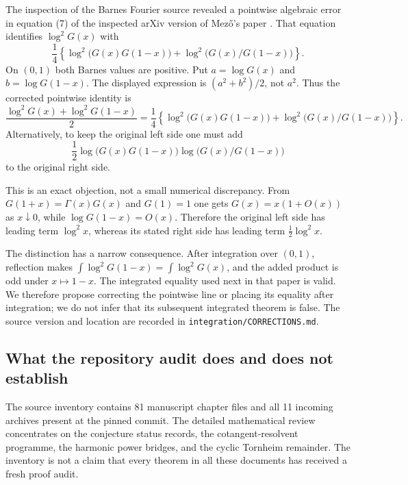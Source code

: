 \documentclass[11pt]{article}
\numberwithin{equation}{section}
\theoremstyle{plain}
\theoremstyle{definition}
\theoremstyle{remark}
\newcommand{\src}[1]{\nolinkurl{#1}}
\begin{document}
The inspection of the Barnes Fourier source revealed a pointwise
algebraic error in equation (7) of the inspected arXiv version of
Mez\H{o}'s paper \cite{bhr:Mezo}. That equation identifies
$\log^2G(x)$ with
\[
 \frac14\left\{
   \log^2\bigl(G(x)G(1-x)\bigr)
   +\log^2\bigl(G(x)/G(1-x)\bigr)\right\}.
\]
On $(0,1)$ both Barnes values are positive. Put
$a=\log G(x)$ and $b=\log G(1-x)$. The displayed expression
is $(a^2+b^2)/2$, not $a^2$. Thus the corrected pointwise identity is
\begin{equation}\label{bhr:eq:Mezo-correction}
 \boxed{\displaystyle
 \frac{\log^2G(x)+\log^2G(1-x)}2
 =\frac14\left\{
   \log^2\bigl(G(x)G(1-x)\bigr)
   +\log^2\bigl(G(x)/G(1-x)\bigr)\right\}.}
\end{equation}
Alternatively, to keep the original left side one must add
\[
 \frac12\log\bigl(G(x)G(1-x)\bigr)
           \log\bigl(G(x)/G(1-x)\bigr)
\]
to the original right side.

This is an exact objection, not a small numerical discrepancy.
From $G(1+x)=\Gamma(x)G(x)$ and $G(1)=1$ one gets
$G(x)=x(1+O(x))$ as $x\downarrow0$, while
$\log G(1-x)=O(x)$. Therefore the original left side has leading
term $\log^2x$, whereas its stated right side has leading term
$\tfrac12\log^2x$.

The distinction has a narrow consequence. After integration over
$(0,1)$, reflection makes
$\int\log^2G(1-x)=\int\log^2G(x)$, and the added product
is odd under $x\mapsto1-x$. The integrated equality used next in
that paper is valid. We therefore propose correcting the pointwise
line or placing its equality after integration; we do not infer
that its subsequent integrated theorem is false. The source version
and location are recorded in \src{integration/CORRECTIONS.md}.

\subsection{What the repository audit does and does not establish}

The source inventory contains 81 manuscript chapter files and all
11 incoming archives present at the pinned commit. The detailed
mathematical review concentrates on the conjecture status records,
the cotangent-resolvent programme, the harmonic power bridges, and
the cyclic Tornheim remainder. The inventory is not a claim that
every theorem in all these documents has received a fresh proof audit.
\end{document}
